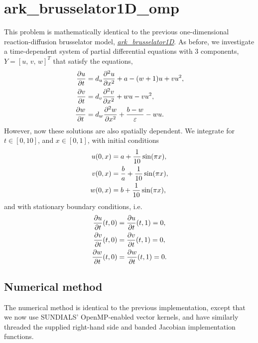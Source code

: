 \documentclass[letterpaper,10pt,english]{sphinxmanual}
\begin{document}
\section{ark\_brusselator1D\_omp}
\label{c_openmp:ark-brusselator1d-omp}\label{c_openmp:id1}
This problem is mathematically identical to the previous
one-dimensional reaction-diffusion brusselator model,
{\hyperref[c_serial:ark-brusselator1d]{\emph{ark\_brusselator1D}}}.  As before, we investigate a time-dependent
system of partial differential equations with 3 components, $Y =
[u,\, v,\, w]^T$ that satisfy the equations,
\begin{gather}
\begin{split}\frac{\partial u}{\partial t} &= d_u \frac{\partial^2 u}{\partial
   x^2} + a - (w+1) u + v u^2, \\
\frac{\partial v}{\partial t} &= d_v \frac{\partial^2 v}{\partial
   x^2} + w u - v u^2, \\
\frac{\partial w}{\partial t} &= d_w \frac{\partial^2 w}{\partial
   x^2} + \frac{b-w}{\varepsilon} - w u.\end{split}\notag
\end{gather}
However, now these solutions are also spatially dependent.  We
integrate for $t \in [0, 10]$, and $x \in [0, 1]$, with
initial conditions
\begin{gather}
\begin{split}u(0,x) &=  a + \frac{1}{10} \sin(\pi x),\\
v(0,x) &= \frac{b}{a} + \frac{1}{10}\sin(\pi x),\\
w(0,x) &=  b + \frac{1}{10}\sin(\pi x),\end{split}\notag
\end{gather}
and with stationary boundary conditions, i.e.
\begin{gather}
\begin{split}\frac{\partial u}{\partial t}(t,0) &= \frac{\partial u}{\partial t}(t,1) = 0,\\
\frac{\partial v}{\partial t}(t,0) &= \frac{\partial v}{\partial t}(t,1) = 0,\\
\frac{\partial w}{\partial t}(t,0) &= \frac{\partial w}{\partial t}(t,1) = 0.\end{split}\notag
\end{gather}

\subsection{Numerical method}
\label{c_openmp:numerical-method}
The numerical method is identical to the previous implementation,
except that we now use SUNDIALS' OpenMP-enabled vector kernels, and
have similarly threaded the supplied right-hand side and banded
Jacobian implementation functions.
\end{document}
